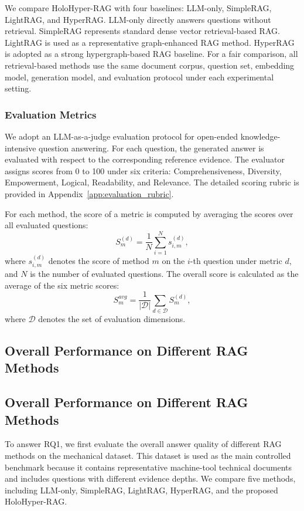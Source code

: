 \documentclass[preprint,12pt]{elsarticle}
\begin{document}
We compare HoloHyper-RAG with four baselines: LLM-only, SimpleRAG, LightRAG, and HyperRAG. LLM-only directly answers questions without retrieval. SimpleRAG represents standard dense vector retrieval-based RAG. LightRAG is used as a representative graph-enhanced RAG method. HyperRAG is adopted as a strong hypergraph-based RAG baseline. For a fair comparison, all retrieval-based methods use the same document corpus, question set, embedding model, generation model, and evaluation protocol under each experimental setting.

\subsubsection{Evaluation Metrics}

We adopt an LLM-as-a-judge evaluation protocol for open-ended knowledge-intensive question answering. For each question, the generated answer is evaluated with respect to the corresponding reference evidence. The evaluator assigns scores from 0 to 100 under six criteria: Comprehensiveness, Diversity, Empowerment, Logical, Readability, and Relevance. The detailed scoring rubric is provided in Appendix~\ref{app:evaluation_rubric}.

For each method, the score of a metric is computed by averaging the scores over all evaluated questions:
\[
S_m^{(d)} = \frac{1}{N}\sum_{i=1}^{N} s_{i,m}^{(d)},
\]
where \(s_{i,m}^{(d)}\) denotes the score of method \(m\) on the \(i\)-th question under metric \(d\), and \(N\) is the number of evaluated questions. The overall score is calculated as the average of the six metric scores:
\[
S_m^{avg} = \frac{1}{|\mathcal{D}|}\sum_{d \in \mathcal{D}} S_m^{(d)},
\]
where \(\mathcal{D}\) denotes the set of evaluation dimensions.
\subsection{Overall Performance on Different RAG Methods}
\subsection{Overall Performance on Different RAG Methods}

To answer RQ1, we first evaluate the overall answer quality of different RAG methods on the mechanical dataset. This dataset is used as the main controlled benchmark because it contains representative machine-tool technical documents and includes questions with different evidence depths. We compare five methods, including LLM-only, SimpleRAG, LightRAG, HyperRAG, and the proposed HoloHyper-RAG.
\end{document}

